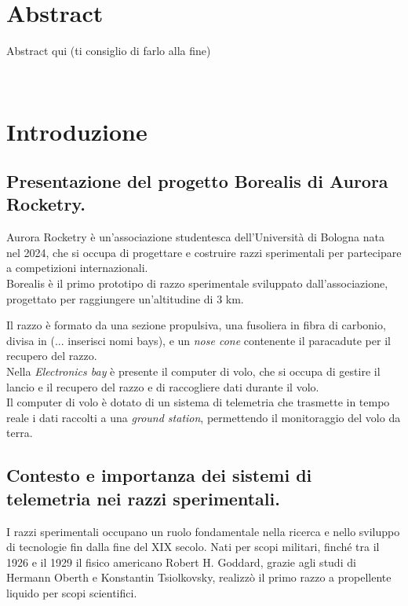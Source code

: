 \documentclass[12pt,a4paper,twoside]{book}
\begin{document}
\chapter*{Abstract}
Abstract qui (ti consiglio di farlo alla fine)

\topmargin=-1cm
\tableofcontents
\thispagestyle{empty}
\listoftables
\thispagestyle{empty}
\listoffigures
\thispagestyle{empty}
\newpage~\newpage


\setcounter{chapter}{0}
\raggedbottom
\chapter{Introduzione} \label{chap:intro}
\pagestyle{plain}
\setcounter{page}{1}

\section{Presentazione del progetto Borealis di Aurora Rocketry.}
Aurora Rocketry è un'associazione studentesca dell'Università di Bologna nata 
nel 2024, che si occupa di progettare e costruire razzi sperimentali per 
partecipare a competizioni internazionali. \\
Borealis è il primo prototipo di razzo sperimentale sviluppato 
dall'associazione, progettato per raggiungere un'altitudine di 3 km.

Il razzo è formato da una sezione propulsiva, una fusoliera in fibra di 
carbonio, divisa in (... inserisci nomi bays), e un \emph{nose cone} contenente 
il paracadute per il recupero del razzo. \\
Nella \emph{Electronics bay} è presente il computer di volo, che si occupa di 
gestire il lancio e il recupero del razzo e di raccogliere dati durante il volo. \\
Il computer di volo è dotato di un sistema di telemetria che trasmette in tempo 
reale i dati raccolti a una \emph{ground station}, permettendo il monitoraggio 
del volo da terra.

\section{Contesto e importanza dei sistemi di telemetria nei razzi sperimentali.}
I razzi sperimentali occupano un ruolo fondamentale nella ricerca e nello 
sviluppo di tecnologie fin dalla fine del XIX secolo.
Nati per scopi militari, finch\'e tra il 1926 e il 1929 il fisico americano 
Robert H. Goddard, grazie agli studi di Hermann Oberth e Konstantin Tsiolkovsky, 
realizz\`o il primo razzo a propellente liquido per scopi scientifici\cite{seibert2006history}.
\end{document}
